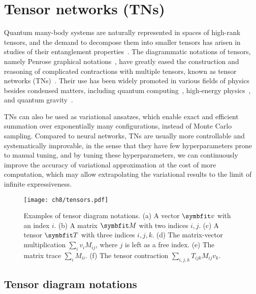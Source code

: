 \chapter{Tensor networks (TNs)}
\label{ch:tn}

Quantum many-body systems are naturally represented in spaces of high-rank tensors, and the demand to decompose them into smaller tensors has arisen in studies of their entanglement properties~\cite{white1992density}. The diagrammatic notations of tensors, namely Penrose graphical notations~\cite{penrose1971applications}, have greatly eased the construction and reasoning of complicated contractions with multiple tensors, known as tensor networks (TNs)~\cite{bridgeman2017hand, orus2014practical}. Their use has been widely promoted in various fields of physics besides condensed matters, including quantum computing~\cite{nielsen2010quantum, cerezo2021variational}, high-energy physics~\cite{banuls2018tensor, banuls2020review}, and quantum gravity~\cite{perez2013spin, you2016entanglement, hayden2016holographic, asaduzzaman2020tensor}.

TNs can also be used as variational ansatzes, which enable exact and efficient summation over exponentially many configurations, instead of Monte Carlo sampling. Compared to neural networks, TNs are usually more controllable and systematically improvable, in the sense that they have few hyperparameters prone to manual tuning, and by tuning these hyperparameters, we can continuously improve the accuracy of variational approximation at the cost of more computation, which may allow extrapolating the variational results to the limit of infinite expressiveness.

\begin{figure}[htb]
\centering
\texttt{[image: ch8/tensors.pdf]}
\caption[Tensor diagram notations]{
Examples of tensor diagram notations.
(a) A vector $\vv$ with an index $i$.
(b) A matrix $\mM$ with two indices $i, j$.
(c) A tensor $\mT$ with three indices $i, j, k$.
(d) The matrix-vector multiplication $\sum_i v_i M_{i j}$, where $j$ is left as a free index.
(e) The matrix trace $\sum_i M_{i i}$.
(f) The tensor contraction $\sum_{i, j, k} T_{i j k} M_{i j} v_k$.
}
\label{fig:tensors}
\end{figure}

\section{Tensor diagram notations}

